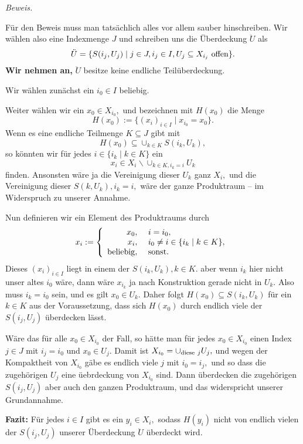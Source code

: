 \documentclass[12pt]{scrbook}   %
\begin{document}
{\it Beweis.}

F\"ur den Beweis muss man tats\"achlich alles vor allem sauber hinschreiben.
Wir w\"ahlen also eine Indexmenge $J$ und schreiben uns die \"Uberdeckung
$\ddot U$ als
$$\ddot U = \{S(i_j,U_j)\mid j\in J, i_j\in I, U_j\subseteq X_{i_j}\ {\rm offen
}\}.$$
{\bf Wir nehmen an,} $\ddot U$ besitze keine endliche Teil\"uberdeckung. 

Wir w\"ahlen zun\"achst ein $i_0\in I$ beliebig. 

Weiter w\"ahlen wir ein $x_0\in X_{i_0},$ und bezeichnen mit $H(x_0)$ die Menge 
$$H(x_0):=\{(x_i)_{i\in I} \mid x_{i_0} = x_0 \}.$$
Wenn es eine endliche Teilmenge $K\subseteq J$ gibt mit
$$H(x_0)\subseteq \cup_{k\in K}S(i_k, U_k),$$
so k\"onnten wir f\"ur jedes $i\in \{i_k\mid k\in K\}$ ein 
$$x_i\in X_i\smallsetminus \cup_{k\in K, i_k=i} U_k$$
finden. Ansonsten w\"are ja die Vereinigung dieser $U_k$ ganz $X_i,$ und
die Vereinigung dieser $S(k,U_k), i_k=i,$ w\"are der ganze Produktraum -- 
im Widerspruch zu unserer Annahme.

Nun definieren wir ein Element des Produktraums durch 
$$x_i := \left\{\begin{array}{rl}
x_0,&\ i = i_0,\\
x_i,&\ i_0\neq i\in \{i_k\mid k\in K\},\\
{\rm beliebig},&\ {\rm sonst}.\\
\end{array}\right.$$
Dieses $(x_i)_{i\in I}$ liegt in einem der $S(i_k,U_k), k\in K.$ aber wenn
$i_k$ hier nicht unser altes $i_0$ w\"are, dann w\"are $x_{i_k}$ ja nach 
Konstruktion gerade nicht in $U_k.$ Also muss $i_k=i_0$ sein, und es gilt
$x_0\in U_k.$ Daher folgt $H(x_0)\subseteq S(i_k,U_k)$ f\"ur ein $k\in K$ aus 
der Voraussetzung, dass sich $H(x_0)$ durch endlich viele der $S(i_j,U_j)$
\"uberdecken l\"asst. 

W\"are das f\"ur alle $x_0\in X_{i_0}$ der Fall, so h\"atte man f\"ur jedes
$x_0\in X_{i_0}$ einen Index $j\in J$ mit $i_j = i_0$ und $x_0\in U_j.$ 
Damit ist $X_{i_0} = \cup_{{\rm diese}\ j} U_j,$ und wegen der Kompaktheit von 
$X_{i_0}$ g\"abe es endlich viele $j$ mit $i_0=i_j,$ und so dass die 
zugeh\"origen $U_j$ eine \"uebrdeckung von $X_{i_0}$ sind. Dann \"uberdecken
die zugeh\"origen $S(i_j,U_j)$ aber auch den ganzen Produktraum, und das
widerspricht unserer Grundannahme.

{\bf Fazit:} F\"ur jedes $i\in I$ gibt es ein $y_i\in X_i,$ sodass 
$H(y_i)$ nicht von endlich vielen der $S(i_j,U_j)$ unserer \"Uberdeckung 
$\ddot U$ \"uberdeckt wird.
\end{document}
